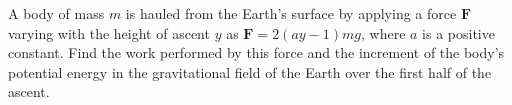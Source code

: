 \item A body of mass \( m \) is hauled from the Earth's surface by applying a force \( \mathbf{F} \) varying with the height of ascent \( y \) as \( \mathbf{F} = 2 \left(a y - 1\right) mg \), where \( a \) is a positive constant. Find the work performed by this force and the increment of the body's potential energy in the gravitational field of the Earth over the first half of the ascent.
\begin{solution}
    \begin{center}
    \end{center}
    
\end{solution}
